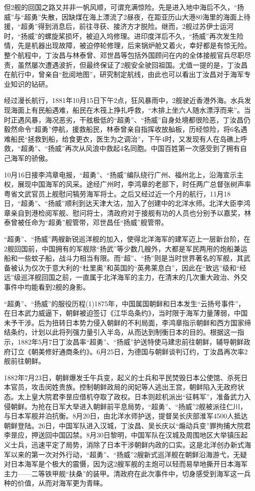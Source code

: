 \documentclass[12pt,UTF8]{ctexbook}
\begin{document}
但2舰的回国之路又并非一帆风顺，可谓充满惊险。先是进入地中海后不久，“扬威”与“超勇”失散，因缺煤在海上漂流了2昼夜，在距亚历山大港80海里的海面上待援，“超勇”得到消息后，前往寻获、接济方才脱险。继而，2舰过苏伊士运河时，“扬威”的螺旋桨损坏，被迫入坞修理。进印度洋后不久，“扬威”再次发生险情，先是机器出现故障，被迫停轮修理，后来锅炉舱又着火，幸好都是有惊无险。整个航程中，丁汝昌与林泰曾、邓世昌等包括外国顾问在内的全体接舰官兵尽职尽责，虽然屡次遭遇波折，但最终保证了2舰安全驶回祖国。尤值一提的是，丁汝昌在航行中，曾亲自“批阅地图”，研究制定航线，由此也可以看出丁汝昌对于海军专业知识的钻研。

经过漫长航行，1881年10月15日下午2点，狂风暴雨中，2舰驶近香港外海。水兵发现海面上有民船遇难，船民在木筏上挣扎呼救，“木排上坐六人随水漂浮而来”。当时正遇风暴，海况恶劣，干舷极低的“超勇”、“扬威”自身处境都很险恶，丁汝昌仍毅然命令“超勇”停航，援救船民，林泰曾亲自指挥收放舢板，历经惊险，将6名遇难船民“拯救到船，给食更衣，医生为之调治”，下午4时，又发现有人在岛礁上呼救，“超勇”、“扬威”再次从风浪中救起4名同胞。中国百姓第一次感受到了拥有自己海军的骄傲。

10月16日接李鸿章电报，“超勇”、“扬威”编队绕行广州、福州北上，沿海宣示主权，展现中国海军的风采。途经广州时，李鸿章的老部下，时任两广总督张树声率粤省文武官员上舰慰问犒劳海军将士。之后又经过近一个月的航行，11月18日，“超勇”、“扬威”顺利到达天津大沽，加入了创建中的北洋水师。北洋大臣李鸿章亲自到港检阅军舰、慰问将士，清政府对于接舰有功的人员也分别予以嘉奖，林泰曾被任命为“超勇”舰管带，邓世昌任“扬威”舰管带。

“超勇”、“扬威”两艘新锐巡洋舰的加入，使得北洋海军的建军迈上一层新台阶，在2舰回国前，中国拥有的军舰除“扬武”等少数几艘外，大都是军民两用的炮船兼运船和一些蚊子船，战斗力相当有限。而“超”、“扬”则是当时世界著名的军舰，其武备被认为仅次于意大利的“杜里奥”和英国的“英弗莱息白”，因此在“致远”级和“经远”级巡洋舰回国之前，一直属于北洋海军的主力，在清末的几次重大政治、外交事件中均能看到2舰的身影。

“超勇”、“扬威”的服役历程(1)1875年，中国属国朝鲜和日本发生“云扬号事件”，在日本武力威逼下，朝鲜被迫签订《江华岛条约》，当时限于海军力量薄弱，中国未予干涉。后为扭转日本势力侵入朝鲜的不利局面，李鸿章指示朝鲜和西方国家缔结条约，计划以此将列强力量引入半岛，从而达到制衡日本的目的。根据这一指示，1882年5月7日丁汝昌率“超勇”、“扬威”护送特使马建忠前往朝鲜，辅导朝鲜政府订立《朝美修好通商条约》。6月25日，为德国与朝鲜谈判订约，丁汝昌再次率2舰前往朝鲜。

1882年7月23日，朝鲜爆发壬午兵变，起义的士兵和平民焚毁日本公使馆、杀死日本官员，攻击闵姓贵族。控制朝鲜政局的闵妃等人逃出王宫，朝鲜陷入无政府状态。太上皇大院君李昰应借机夺取了政权。日本则趁机派出“征韩军”，准备武力入侵朝鲜。为抢在日军大举进入朝鲜前平息局势，“超勇”、“扬威”2舰被派往仁川，与日本军舰并泊抗衡。8月20日，由北洋水师护送，提督吴长庆部淮军4500人抵达朝鲜登陆。26日，中国军队进入汉城，丁汝昌、吴长庆以“煽动兵变”罪拘捕大院君李昰应，押送回中国囚禁。8月30日黎明，中国军队在汉城及周围地区大举镇压起义士兵，迅速平定了局势，消除了日本干涉朝鲜内政的口实。这是北洋创办新式海军以来的第一次对外行动，“超勇”、“扬威”2艘新式巡洋舰在朝鲜沿海游弋，无疑对日本海军是个极大的震慑，因为这2艘军舰的主炮可以轻而易举地撕开日本海军主力——二等铁甲舰“扶桑”的装甲。清政府在此次事件中，切身感受到海军这一兵种的价值，从而对海军更为青睐。
\end{document}
